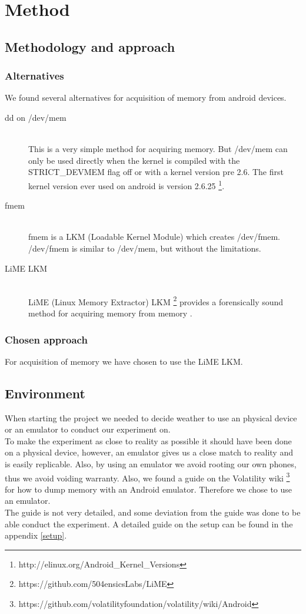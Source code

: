 \section{Method}
\subsection{Methodology and approach}
  \subsubsection{Alternatives}
  We found several alternatives for acquisition of memory from android devices.
  \begin{description}
    \item[dd on /dev/mem] \hfill \\
      This is a very simple method for acquiring memory. But /dev/mem can only be used directly when the kernel is 
      compiled with the STRICT\_DEVMEM flag off or with a kernel version pre 2.6. The first kernel version ever used on 
      android is version 2.6.25 \footnote{http://elinux.org/Android\_Kernel\_Versions}.
    \item[fmem] \hfill \\
      fmem is a LKM (Loadable Kernel Module) which creates /dev/fmem. /dev/fmem is similar to /dev/mem, but without the limitations.
    \item[LiME LKM] \hfill \\
      LiME (Linux Memory Extractor) LKM \footnote{https://github.com/504ensicsLabs/LiME} provides a forensically sound method for acquiring memory from 
      memory \cite{heriyanto2013procedures}.
  \end{description}
  \subsubsection{Chosen approach}
  For acquisition of memory we have chosen to use the LiME LKM.
\subsection{Environment}
When starting the project we needed to decide weather to use an physical device or an emulator
to conduct our experiment on.\\
To make the experiment as close to reality as possible it should have been done on a physical device, 
however, an emulator gives us a close match to reality and is easily replicable. Also, by using an emulator 
we avoid rooting our own phones, thus we avoid voiding warranty. Also, we found a guide on the Volatility 
wiki \footnote{https://github.com/volatilityfoundation/volatility/wiki/Android} for how to dump memory with 
an Android emulator. Therefore we chose to use an emulator.\\
The guide is not very detailed, and some deviation from the guide was done to be able conduct the experiment. 
A detailed guide on the setup can be found in the appendix \ref{setup}.\\

